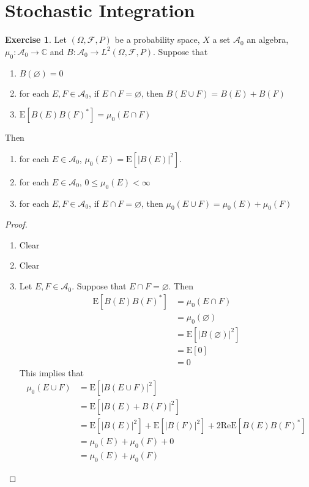 \documentclass[12pt]{amsart}
\theoremstyle{definition}
\newtheorem{ex}[definition]{Exercise}
\newcommand{\Om}{\Omega}
\newcommand{\C}{\mathbb{C}}
\newcommand{\MA}{\mathcal{A}}
\newcommand{\MF}{\mathcal{F}}
\newcommand{\E}{\text{E}}
\renewcommand{\Re}{\text{Re}}
\begin{document}
	
	
	
	
	
	
	
	
	
	
	
	
	
	
	
	
	
	
	
	
	
	\newpage
	\section{Stochastic Integration}
	\begin{ex}
	Let $(\Om, \MF, P)$ be a probability space, $X$ a set $\MA_0$ an algebra, $\mu_0:\MA_0 \rightarrow \C$ and $B:\MA_0 \rightarrow L^2(\Om, \MF, P)$. 
	Suppose that 
	\begin{enumerate}
	\item $B(\varnothing) = 0$
	\item for each $E, F \in \MA_0$, if $E \cap F = \varnothing$, then $B(E \cup F) = B(E) + B(F)$
	\item $\E [B(E)B(F)^*] = \mu_0(E \cap F)$
	\end{enumerate}
	Then 
	\begin{enumerate}
	\item for each $E \in \MA_0$, $\mu_0(E) = \E[|B(E)|^2]$.
	\item for each $E \in \MA_0$, $0 \leq \mu_0(E) < \infty$ 
	\item for each $E, F \in \MA_0$, if $E \cap F = \varnothing$, then $\mu_0(E \cup F) = \mu_0(E) + \mu_0(F)$
	\end{enumerate}
	\end{ex}
	
	\begin{proof}\
	\begin{enumerate}
	\item Clear 
	\item Clear
	\item Let $E, F \in \MA_0$. Suppose that $E \cap F = \varnothing$. Then 
	\begin{align*}
	\E[B(E)B(F)^*] 
	&= \mu_0(E \cap F) \\
	&= \mu_0(\varnothing) \\
	&= \E[|B(\varnothing)|^2] \\
	&= \E[0] \\
	&= 0
	\end{align*}
	This implies that 
	\begin{align*}
	\mu_0(E \cup F) 
	&= \E[|B(E \cup F)|^2] \\
	&= \E[|B(E) + B(F)|^2] \\
	&= \E[|B(E)|^2] + \E[|B(F)|^2] + 2 \Re \E[B(E)B(F)^*] \\
	&= \mu_0(E) + \mu_0(F) +0  \\
	&=  \mu_0(E) + \mu_0(F) 
	\end{align*}
	\end{enumerate}
	\end{proof}
	
\end{document}
